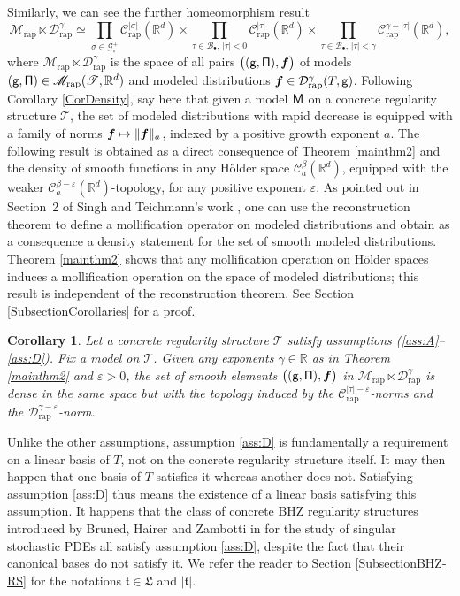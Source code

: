 \documentclass[JEP,XML,SOM,Unicode,published]{cedram}
\newcommand\mto{\mathchoice{\longmapsto}{\mapsto}{\mapsto}{\mapsto}}
\newcommand{\sbullet}{{\scriptscriptstyle\bullet}}
\theoremstyle{plain}
\newtheorem{cor}[thm]{Corollary}
\theoremstyle{definition}
\newcommand{\bsf}{\boldsymbol{f}}
\newcommand{\rap}{\mathrm{rap}}
\newcommand{\scrM}{\mathscr{M}}
\newcommand{\scrT}{\mathscr{T}}
\let\epsilon\varepsilon
\newcommand{\bbR}{\mathbb{R}}
\newcommand{\mcB}{\mathcal{B}}
\newcommand{\mcC}{\mathcal{C}}
\newcommand{\mcD}{\mathcal{D}}
\newcommand{\mcG}{\mathcal{G}}
\begin{document}
Similarly, we can see the further homeomorphism result
\[
\scrM_{\rap}\ltimes\mcD_{\rap}^\gamma \simeq
\prod_{\sigma\in\mcG_\circ^+} \mcC_\rap^{|\sigma|}(\bbR^d) \times \prod_{\tau\in\mcB_\sbullet,\,|\tau|<0} \mcC_\rap^{|\tau|}(\bbR^d)
\times \prod_{\tau\in\mcB_\sbullet,\, |\tau|<\gamma} \mcC_\rap^{\gamma-|\tau|}(\bbR^d),
\]
where $\scrM_{\rap}\ltimes\mcD_{\rap}^\gamma$ is the space of all pairs $\bigl(({\sf g},{\sf\Pi}),\bsf\bigr)$ of models $({\sf g},{\sf\Pi})\in\scrM_{\rap}(\scrT,\bbR^d)$ and modeled distributions $\bsf\in\mcD_{\rap}^\gamma(T,{\sf g})$. Following Corollary \ref{CorDensity}, say here that given a model $\sf M$ on a concrete regularity structure $\mathscr{T}$, the set of modeled distributions with rapid decrease is equipped with a family of norms $\bsf \mto \|\bsf\|_a$, indexed by a positive growth exponent $a$. The following result is obtained as a direct consequence of Theorem \ref{mainthm2} and the density of smooth functions in any Hölder space $\mcC_a^\beta(\bbR^d)$, equipped with the weaker $\mcC_a^{\beta-\epsilon}(\bbR^d)$-topology, for any positive exponent $\epsilon$. As pointed out in Section~2 of Singh and Teichmann's work \cite{SinghTeichmann}, one can use the reconstruction theorem to define a mollification operator on modeled distributions and obtain as a consequence a density statement for the set of smooth modeled distributions. Theorem \ref{mainthm2} shows that any mollification operation on Hölder spaces induces a mollification operation on the space of modeled distributions; this result is independent of the reconstruction theorem. See Section \ref{SubsectionCorollaries} for a proof.

\begin{cor} \label{CorDensitySmoothModelled}
Let a concrete regularity structure $\scrT$ satisfy assumptions \textup{(\ref{ass:A}--\ref{ass:D})}. Fix a model on $\mathscr{T}$. Given any exponents $\gamma\in\bbR$ as in Theorem \ref{mainthm2} and $\epsilon>0$, the set of smooth elements $\bigl(({\sf g},{\sf\Pi}),\bsf\bigr)$ in $\scrM_{\rap}\ltimes\mcD_{\rap}^\gamma$ is dense in the same space but with the topology induced by the $\mcC_{\rap}^{|\tau|-\epsilon}$-norms and the $\mcD_{\rap}^{\gamma-\epsilon}$-norm.
\end{cor}

Unlike the other assumptions, assumption \eqref{ass:D} is fundamentally a requirement on a linear basis of $T$, not on the concrete regularity structure itself. It may then happen that one basis of $T$ satisfies it whereas another does not. Satisfying assumption \eqref{ass:D} thus means the existence of a linear basis satisfying this assumption. It happens that the class of concrete BHZ regularity structures introduced by Bruned, Hairer and Zambotti in \cite{BHZ} for the study of singular stochastic PDEs all satisfy assumption \eqref{ass:D}, despite the fact that their canonical bases do not satisfy it. We refer the reader to Section \ref{SubsectionBHZ-RS} for the notations $\mathfrak{t}\in\mathfrak{L}$ and $|\mathfrak{t}|$.
\end{document}
